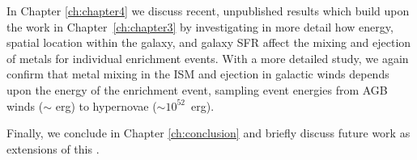 In Chapter \ref{ch:chapter4} we discuss recent, unpublished results which build upon the work in Chapter~\ref{ch:chapter3} by investigating in more detail how energy, spatial location within the galaxy, and galaxy SFR affect the mixing and ejection of metals for individual enrichment events. With a more detailed study, we again confirm that metal mixing in the ISM and ejection in galactic winds depends upon the energy of the enrichment event, sampling event energies from AGB winds ($\sim$ erg) to hypernovae ($\sim 10^{52}$~erg).

Finally, we conclude in Chapter \ref{ch:conclusion} and briefly discuss future work as extensions of this \Dissertation.

%
